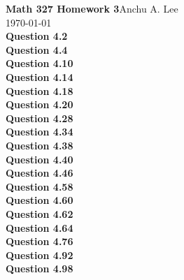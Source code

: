 \documentclass{article}
\begin{document}
    \noindent\textbf{Math 327 Homework 3}\hfill Anchu A. Lee\\
    \noindent\today\\
    
    \noindent\textbf{Question 4.2}\\
    \textbf{Question 4.4}\\
    \textbf{Question 4.10}\\
    \textbf{Question 4.14}\\
    \textbf{Question 4.18}\\
    \textbf{Question 4.20}\\
    \textbf{Question 4.28}\\
    \textbf{Question 4.34}\\
    \textbf{Question 4.38}\\
    \textbf{Question 4.40}\\
    \textbf{Question 4.46}\\
    \textbf{Question 4.58}\\
    \textbf{Question 4.60}\\
    \textbf{Question 4.62}\\
    \textbf{Question 4.64}\\
    \textbf{Question 4.76}\\
    \textbf{Question 4.92}\\
    \textbf{Question 4.98}\\
\end{document}

